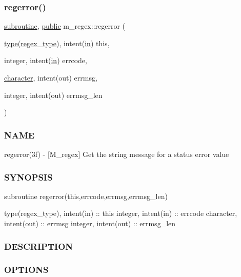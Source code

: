 \subsubsection{\texorpdfstring{regerror()}{regerror()}}
{\footnotesize\ttfamily \hyperlink{M__stopwatch_83_8txt_acfbcff50169d691ff02d4a123ed70482}{subroutine}, \hyperlink{M__stopwatch_83_8txt_a2f74811300c361e53b430611a7d1769f}{public} m\+\_\+regex\+::regerror (\begin{DoxyParamCaption}\item[{\hyperlink{stop__watch_83_8txt_a70f0ead91c32e25323c03265aa302c1c}{type}(\hyperlink{structm__regex_1_1regex__type}{regex\+\_\+type}), intent(\hyperlink{M__journal_83_8txt_afce72651d1eed785a2132bee863b2f38}{in})}]{this,  }\item[{integer, intent(\hyperlink{M__journal_83_8txt_afce72651d1eed785a2132bee863b2f38}{in})}]{errcode,  }\item[{\hyperlink{option__stopwatch_83_8txt_abd4b21fbbd175834027b5224bfe97e66}{character}, intent(out)}]{errmsg,  }\item[{integer, intent(out)}]{errmsg\+\_\+len }\end{DoxyParamCaption})}



\subsubsection*{N\+A\+ME}

regerror(3f) -\/ \mbox{[}M\+\_\+regex\mbox{]} Get the string message for a status error value \subsubsection*{S\+Y\+N\+O\+P\+S\+IS}

subroutine regerror(this,errcode,errmsg,errmsg\+\_\+len)

type(regex\+\_\+type), intent(in) \+:\+: this integer, intent(in) \+:\+: errcode character, intent(out) \+:\+: errmsg integer, intent(out) \+:\+: errmsg\+\_\+len

\subsubsection*{D\+E\+S\+C\+R\+I\+P\+T\+I\+ON}

\subsubsection*{O\+P\+T\+I\+O\+NS}

